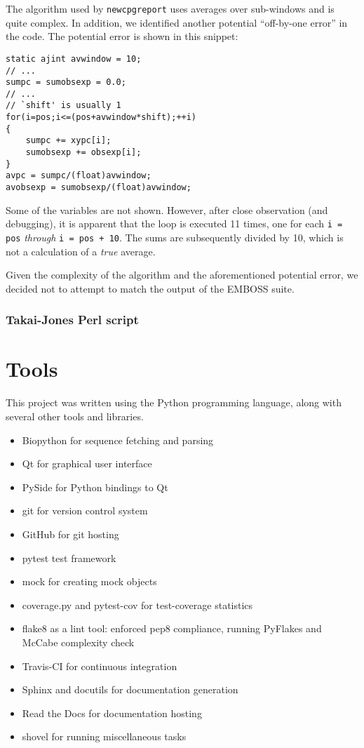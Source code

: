 \documentclass{bioinfo}
\begin{document}
The algorithm used by \texttt{newcpgreport} uses averages over
sub-windows and is quite complex. In addition, we identified another
potential ``off-by-one error'' in the code. The potential error is
shown in this snippet:

\begin{verbatim}
static ajint avwindow = 10;
// ...
sumpc = sumobsexp = 0.0;
// ...
// `shift' is usually 1
for(i=pos;i<=(pos+avwindow*shift);++i)
{
    sumpc += xypc[i];
    sumobsexp += obsexp[i];
}
avpc = sumpc/(float)avwindow;
avobsexp = sumobsexp/(float)avwindow;
\end{verbatim}

Some of the variables are not shown. However, after close observation
(and debugging), it is apparent that the loop is executed 11 times,
one for each \verb|i = pos| \emph{through} \verb|i = pos + 10|. The
sums are subsequently divided by 10, which is not a calculation of a
\emph{true} average.

Given the complexity of the algorithm and the aforementioned potential
error, we decided not to attempt to match the output of the EMBOSS
suite.

\subsubsection{Takai-Jones Perl script}

\section{Tools}

This project was written using the Python programming language, along with several other tools and libraries.

\begin{itemize}
\item Biopython for sequence fetching and parsing
\item Qt for graphical user interface
\item PySide for Python bindings to Qt
\item git for version control system
\item GitHub for git hosting
\item pytest test framework
\item mock for creating mock objects
\item coverage.py and pytest-cov for test-coverage statistics
\item flake8 as a lint tool: enforced pep8 compliance, running PyFlakes and McCabe complexity check
\item Travis-CI for continuous integration
\item Sphinx and docutils for documentation generation
\item Read the Docs for documentation hosting
\item shovel for running miscellaneous tasks
\end{itemize}
\end{document}
